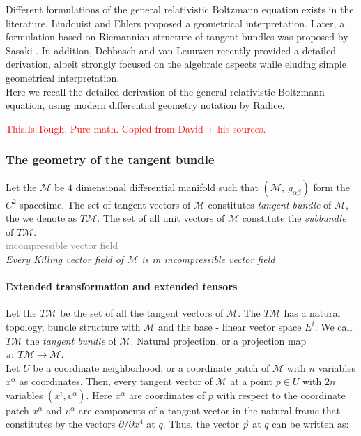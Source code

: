\documentclass[11pt,a4paper,headinclude=true,DIV=14,BCOR=8mm,chapterprefix,listof=totoc,twoside,openright,abstracton]{scrbook}
\begin{document}
Different formulations of the general relativistic Boltzmann equation exists in the literature. Lindquist \cite{Lindquist:1966} and Ehlers \cite{Ehlers:1971} proposed a geometrical interpretation. Later, a formulation based on Riemannian structure of tangent bundles was proposed by Sasaki \cite{Sasaki:1958,Sasaki:1962}. In addition, Debbasch and van Leuuwen \cite{Debbasch:2009a,Debbasch:2009b} recently provided a detailed derivation, albeit strongly focused on the algebraic aspects while eluding simple geometrical interpretation. \\
Here we recall the detailed derivation of the general relativistic Boltzmann equation, using modern differential geometry notation by Radice. 

\textcolor{red}{This.Is.Tough. Pure math. Copied from David + his sources.}

\subsubsection{The geometry of the tangent bundle}

Let the $\mathcal{M}$ be $4$ dimensional differential manifold such that $(\mathcal{M},\: g_{\alpha\beta})$ form the $C^2$ spacetime. The set of tangent vectors of $\mathcal{M}$ constitutes \textit{tangent bundle} of $\mathcal{M}$, the we denote as $T\mathcal{M}$. The set of all unit vectors of $\mathcal{M}$ constitute the \textit{subbundle} of $T\mathcal{M}$. \\
\textcolor{gray}{incompressible vector field}\\
\textit{Every Killing vector field of $\mathcal{M}$ is in incompressible vector field}

\paragraph{Extended transformation and extended tensors}

Let the $T\mathcal{M}$ be the set of all the tangent vectors of $\mathcal{M}$. The $T\mathcal{M}$ has a natural topology, bundle structure with $\mathcal{M}$ and the base - linear vector space $E^i$. We call $T\mathcal{M}$ the \textit{tangent bundle} of $\mathcal{M}$. Natural projection, or a projection map $\pi:\: T\mathcal{M}\rightarrow\mathcal{M}$.  \\

Let $U$ be a coordinate neighborhood, or a coordinate patch of $\mathcal{M}$ with $n$ variables $x^{\alpha}$ as coordinates. Then, every tangent vector of $\mathcal{M}$ at a point $p\in U$ with $2n$ variables $(x^i,\upsilon^{\alpha})$. Here $x^{\alpha}$ are coordinates of $p$ with respect to the coordinate patch ${x^{\alpha}}$ and $\upsilon^{\alpha}$ are components of a tangent vector in the natural frame that constitutes by the vectors $\partial/\partial x^4$ at $q$. Thus, the vector $\vec{p}$ at $q$ can be written as:
\end{document}
